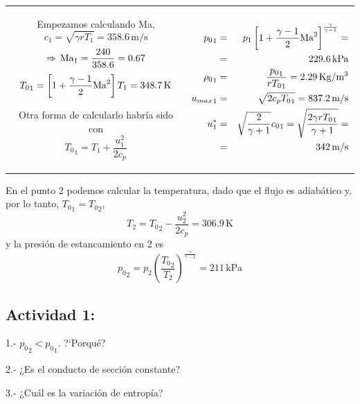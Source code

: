 		\begin{tabular}{c|c}
			\begin{minipage}[c]{0.45\textwidth}%
				Empezamos calculando Ma, {\footnotesize{}
					\[
					c_{1}=\sqrt{\gamma rT_{1}}=358.6\,\text{m/s}
					\]
					\[
					\Rightarrow\,\text{Ma}_{1}=\frac{240}{358.6}=0.67
					\]
					\[
					{T_{0}}_{1}=\left[1+\frac{\gamma-1}{2}\text{Ma}^{2}\right]T_{1}=348.7\,\text{K}
					\]
				}{\footnotesize\par}
				
				Otra forma de calcularlo habría sido con 
				\[
				{T_{0}}_{1}=T_{1}+\frac{u_{1}^{2}}{2c_{p}}
				\]
			\end{minipage} & %
			\begin{minipage}[c]{0.45\textwidth}%
				{\footnotesize{}
					\begin{eqnarray*}
						{p_{0}}_{1} & = & p_{1}\left[1+\frac{\gamma-1}{2}\text{Ma}^{2}\right]^{\frac{\gamma}{\gamma-1}}=\\
						& = & 229.6\,\text{kPa}\\
						{\rho_{0}}_{1} & = & \frac{{p_{0}}_{1}}{r{T_{0}}_{1}}=2.29\,\text{Kg}/\text{m}^{3}\\
						{u_{max}}_{1} & = & \sqrt{2c_{p}{T_{0}}_{1}}=837.2\,\text{m/s}\\
						u_{1}^{*} & = & \sqrt{\frac{2}{\gamma+1}}{c_{0}}_{1}=\sqrt{\frac{2\gamma r{T_{0}}_{1}}{\gamma+1}}=\\
						& = & 342\,\text{m/s}
					\end{eqnarray*}
				} %
			\end{minipage}\tabularnewline
		\end{tabular}
		
		En el punto 2 podemos calcular la temperatura, dado que el flujo
		es adiabático y, por lo tanto, ${T_{0}}_{1}={T_{0}}_{2}$, 
		\[
		T_{2}={T_{0}}_{2}-\frac{u_{2}^{2}}{2c_{p}}=306.9\,\text{K}
		\]
		y la presión de estancamiento en 2 es 
		\[
		{p_{0}}_{2}=p_{2}\left(\frac{{T_{0}}_{2}}{T_{2}}\right)^{\frac{\gamma}{\gamma-1}}=211\,\text{kPa}
		\]

\subsection*{Actividad 1:}
		
		1.- ${p_{0}}_{2}<{p_{0}}_{1}$. ?`Porqué?
		
		2.- ¿Es el conducto de sección constante?
		
		3.- ¿Cuál es la variación de entropía?

